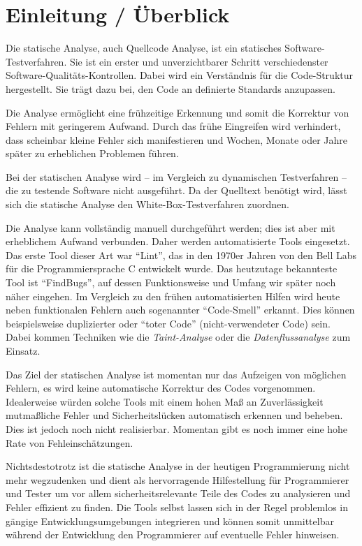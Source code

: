\section{Einleitung / \"Uberblick}
Die statische Analyse, auch Quellcode Analyse, ist ein statisches Software-Testverfahren. Sie ist ein erster und unverzichtbarer Schritt verschiedenster Software-Qualitäts-Kontrollen. Dabei wird ein Verständnis für die Code-Struktur hergestellt. Sie trägt dazu bei, den Code an definierte Standards anzupassen.

Die Analyse ermöglicht eine frühzeitige Erkennung und somit die Korrektur von Fehlern mit geringerem Aufwand. Durch das frühe Eingreifen wird verhindert, dass scheinbar kleine Fehler sich manifestieren und Wochen, Monate oder Jahre später zu erheblichen Problemen führen.

Bei der statischen Analyse wird -- im Vergleich zu dynamischen Testverfahren -- die zu testende Software nicht ausgeführt. Da der Quelltext benötigt wird, lässt sich die statische Analyse den White-Box-Testverfahren zuordnen.

Die Analyse kann vollständig manuell durchgeführt werden; dies ist aber mit erheblichem Aufwand verbunden. Daher werden automatisierte Tools eingesetzt. Das erste Tool dieser Art war ``Lint'', das in den 1970er Jahren von den Bell Labs für die Programmiersprache C entwickelt wurde. Das heutzutage bekannteste Tool ist ``FindBugs'', auf dessen Funktionsweise und Umfang wir später noch näher eingehen. Im Vergleich zu den frühen automatisierten Hilfen wird heute neben funktionalen Fehlern auch sogenannter ``Code-Smell'' erkannt. Dies können beispielsweise duplizierter oder ``toter Code'' (nicht-verwendeter Code) sein. Dabei kommen Techniken wie die \emph{Taint-Analyse} oder die \emph{Datenflussanalyse} zum Einsatz.

Das Ziel der statischen Analyse ist momentan nur das Aufzeigen von möglichen Fehlern, es wird keine automatische Korrektur des Codes vorgenommen. Idealerweise würden solche Tools mit einem hohen Maß an Zuverlässigkeit mutmaßliche Fehler und Sicherheitslücken automatisch erkennen und beheben. Dies ist jedoch noch nicht realisierbar. Momentan gibt es noch immer eine hohe Rate von Fehleinschätzungen.

Nichtsdestotrotz ist die statische Analyse in der heutigen Programmierung nicht mehr wegzudenken und dient als hervorragende Hilfestellung für Programmierer und Tester um vor allem sicherheitsrelevante Teile des Codes zu analysieren und Fehler effizient zu finden.
Die Tools selbst lassen sich in der Regel problemlos in gängige Entwicklungsumgebungen integrieren und können somit unmittelbar während der Entwicklung den Programmierer auf eventuelle Fehler hinweisen.

